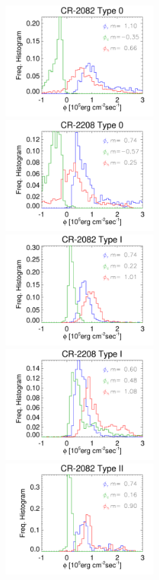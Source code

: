 \documentclass[namedreferences]{solarphysics}
\begin{document}
\begin{article}
\begin{figure}[h!]
\begin{center}
\includegraphics[width=0.495\textwidth]{histocr2082_ccdownenergia.pdf}
\includegraphics[width=0.495\textwidth]{histocr2208_ccdownenergia.pdf}
\includegraphics[width=0.495\textwidth]{histocr2082_ccenergia.pdf}
\includegraphics[width=0.495\textwidth]{histocr2208_ccenergia.pdf}
\includegraphics[width=0.495\textwidth]{histocr2082_cgenergia.pdf}

\end{center}
\end{figure}
\end{article}
\end{document}
